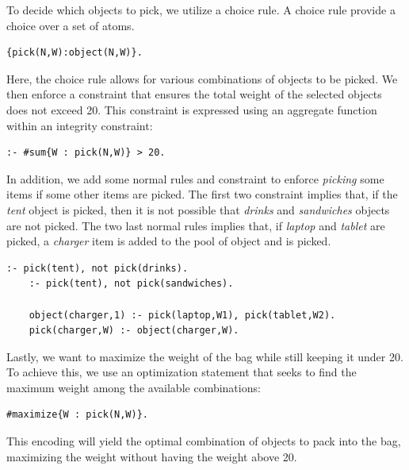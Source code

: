To decide which objects to pick, we utilize a choice rule. A choice rule provide a choice over a set of atoms.

\begin{minipage}[H]{\linewidth}
\begin{lstlisting}[style=mystyle]
    {pick(N,W):object(N,W)}.
\end{lstlisting}
\end{minipage}

Here, the choice rule allows for various combinations of objects to be picked. We then enforce a constraint that ensures the total weight of the selected objects does not exceed 20. This constraint is expressed using an aggregate function within an integrity constraint:

\begin{minipage}[H]{\linewidth}
\begin{lstlisting}[style=mystyle]
    :- #sum{W : pick(N,W)} > 20. 
\end{lstlisting}
\end{minipage}

In addition, we add some normal rules and constraint to enforce \textit{picking} some items if some other items are picked. The first two constraint implies that, if the \textit{tent} object is picked, then it is not possible that \textit{drinks} and \textit{sandwiches} objects are not picked. The two last normal rules implies that, if \textit{laptop} and \textit{tablet} are picked, a \textit{charger} item is added to the pool of object and is picked.

\begin{minipage}[H]{\linewidth}
    \begin{lstlisting}[style=mystyle]
    :- pick(tent), not pick(drinks).
    :- pick(tent), not pick(sandwiches).
    
    object(charger,1) :- pick(laptop,W1), pick(tablet,W2).
    pick(charger,W) :- object(charger,W). 
\end{lstlisting}
\end{minipage}


Lastly, we want to maximize the weight of the bag while still keeping it under 20. To achieve this, we use an optimization statement that seeks to find the maximum weight among the available combinations:

\begin{minipage}[H]{\linewidth}
\begin{lstlisting}[style=mystyle]
    #maximize{W : pick(N,W)}. 
\end{lstlisting}
\end{minipage}
This encoding will yield the optimal combination of objects to pack into the bag, maximizing the weight without having the weight above 20.

